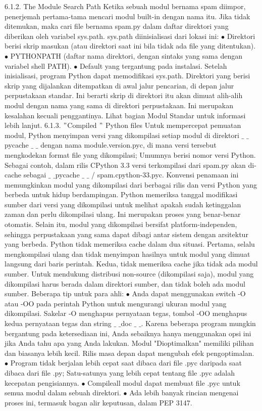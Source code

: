 6.1.2. The Module Search Path 
Ketika sebuah modul bernama spam diimpor, penerjemah pertama-tama mencari modul built-in dengan nama itu. Jika tidak ditemukan, maka cari file bernama spam.py dalam daftar direktori yang diberikan oleh variabel sys.path. sys.path diinisialisasi dari lokasi ini:
 $ \bullet $ Direktori berisi skrip masukan (atau direktori saat ini bila tidak ada file yang ditentukan). 
 $ \bullet $ PYTHONPATH (daftar nama direktori, dengan sintaks yang sama dengan variabel shell PATH).
 $ \bullet $ Default yang tergantung pada instalasi.
Setelah inisialisasi, program Python dapat memodifikasi sys.path. Direktori yang berisi skrip yang dijalankan ditempatkan di awal jalur pencarian, di depan jalur perpustakaan standar. Ini berarti skrip di direktori itu akan dimuat alih-alih modul dengan nama yang sama di direktori perpustakaan. Ini merupakan kesalahan kecuali penggantinya. Lihat bagian Modul Standar untuk informasi lebih lanjut.
6.1.3.  $ " $Compiled $ " $ Python files
Untuk mempercepat pemuatan modul, Python menyimpan versi yang dikompilasi setiap modul di direktori  $  \_  $ $  \_  $pycache $  \_  $ $  \_  $ dengan nama module.version.pyc, di mana versi tersebut mengkodekan format file yang dikompilasi; Umumnya berisi nomor versi Python. Sebagai contoh, dalam rilis CPython 3.3 versi terkompilasi dari spam.py akan di-cache sebagai  $  \_  $ $  \_  $pycache  $  \_  $ $  \_  $ / spam.cpython-33.pyc. Konvensi penamaan ini memungkinkan modul yang dikompilasi dari berbagai rilis dan versi Python yang berbeda untuk hidup berdampingan. 
Python memeriksa tanggal modifikasi sumber dari versi yang dikompilasi untuk melihat apakah sudah ketinggalan zaman dan perlu dikompilasi ulang. Ini merupakan proses yang benar-benar otomatis. Selain itu, modul yang dikompilasi bersifat platform-independen, sehingga perpustakaan yang sama dapat dibagi antar sistem dengan arsitektur yang berbeda. Python tidak memeriksa cache dalam dua situasi. Pertama, selalu mengkompilasi ulang dan tidak menyimpan hasilnya untuk modul yang dimuat langsung dari baris perintah. Kedua, tidak memeriksa cache jika tidak ada modul sumber. Untuk mendukung distribusi non-source (dikompilasi saja), modul yang dikompilasi harus berada dalam direktori sumber, dan tidak boleh ada modul sumber.
Beberapa tip untuk para ahli: 
 $ \bullet $ Anda dapat menggunakan switch -O atau -OO pada perintah Python untuk mengurangi ukuran modul yang dikompilasi. Sakelar -O menghapus pernyataan tegas, tombol -OO menghapus kedua pernyataan tegas dan string  $  \_  $ $  \_  $doc $  \_  $ $  \_  $. Karena beberapa program mungkin bergantung pada ketersediaan ini, Anda sebaiknya hanya menggunakan opsi ini jika Anda tahu apa yang Anda lakukan. Modul "Dioptimalkan" memiliki pilihan dan biasanya lebih kecil. Rilis masa depan dapat mengubah efek pengoptimalan.
 $ \bullet $ Program tidak berjalan lebih cepat saat dibaca dari file .pyc daripada saat dibaca dari file .py; Satu-satunya yang lebih cepat tentang file .pyc adalah kecepatan pengisiannya.
 $ \bullet $ Compileall modul dapat membuat file .pyc untuk semua modul dalam sebuah direktori.
 $ \bullet $ Ada lebih banyak rincian mengenai proses ini, termasuk bagan alir keputusan, dalam PEP 3147.
